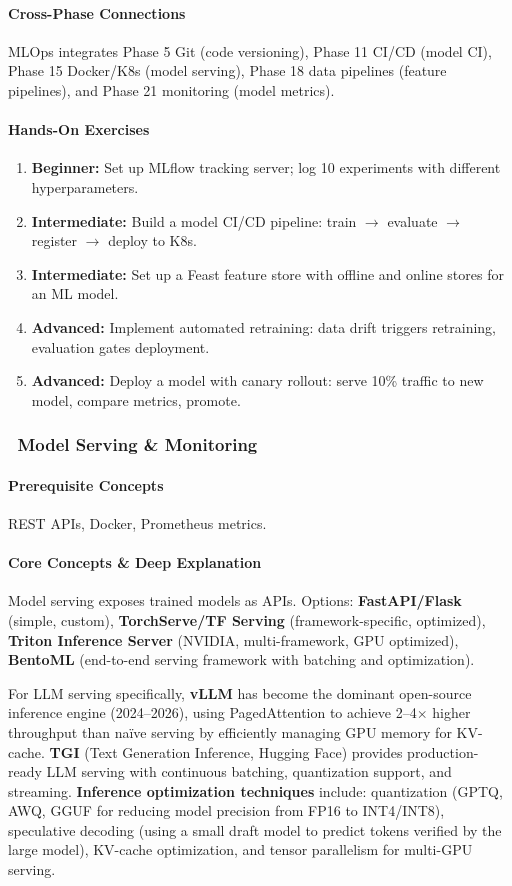 \documentclass[11pt, a4paper, oneside]{report}
\newcommand{\mustmaster}[1]{\subsubsection{\texorpdfstring{\fcolorbox{blue!40!black}{blue!8}{\footnotesize\bfseries\color{blue!40!black} MUST MASTER}~#1}{#1}}}
\newcommand{\arrow}{$\rightarrow$}
\begin{document}
\paragraph{Cross-Phase Connections} MLOps integrates Phase 5 Git (code versioning), Phase 11 CI/CD (model CI), Phase 15 Docker/K8s (model serving), Phase 18 data pipelines (feature pipelines), and Phase 21 monitoring (model metrics).

\paragraph{Hands-On Exercises}
\begin{enumerate}[leftmargin=*]
\item \textbf{Beginner:} Set up MLflow tracking server; log 10 experiments with different hyperparameters.
\item \textbf{Intermediate:} Build a model CI/CD pipeline: train \arrow{} evaluate \arrow{} register \arrow{} deploy to K8s.
\item \textbf{Intermediate:} Set up a Feast feature store with offline and online stores for an ML model.
\item \textbf{Advanced:} Implement automated retraining: data drift triggers retraining, evaluation gates deployment.
\item \textbf{Advanced:} Deploy a model with canary rollout: serve 10\% traffic to new model, compare metrics, promote.
\end{enumerate}

\mustmaster{Model Serving \& Monitoring}

\paragraph{Prerequisite Concepts} REST APIs, Docker, Prometheus metrics.

\paragraph{Core Concepts \& Deep Explanation} Model serving exposes trained models as APIs. Options: \textbf{FastAPI/Flask} (simple, custom), \textbf{TorchServe/TF Serving} (framework-specific, optimized), \textbf{Triton Inference Server} (NVIDIA, multi-framework, GPU optimized), \textbf{BentoML} (end-to-end serving framework with batching and optimization).

For LLM serving specifically, \textbf{vLLM} has become the dominant open-source inference engine (2024--2026), using PagedAttention to achieve 2--4$\times$ higher throughput than na\"ive serving by efficiently managing GPU memory for KV-cache. \textbf{TGI} (Text Generation Inference, Hugging Face) provides production-ready LLM serving with continuous batching, quantization support, and streaming. \textbf{Inference optimization techniques} include: quantization (GPTQ, AWQ, GGUF for reducing model precision from FP16 to INT4/INT8), speculative decoding (using a small draft model to predict tokens verified by the large model), KV-cache optimization, and tensor parallelism for multi-GPU serving.
\end{document}
